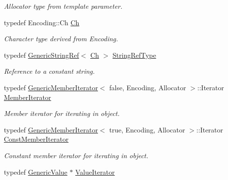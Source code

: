 \begin{DoxyCompactItemize}
\begin{DoxyCompactList}\small\item\em Allocator type from template parameter. \end{DoxyCompactList}\item 
typedef Encoding\+::\+Ch \hyperlink{class_generic_value_ade0e0ce64ccd5d852da57a35e720bafb}{Ch}\hypertarget{class_generic_value_ade0e0ce64ccd5d852da57a35e720bafb}{}\label{class_generic_value_ade0e0ce64ccd5d852da57a35e720bafb}

\begin{DoxyCompactList}\small\item\em Character type derived from Encoding. \end{DoxyCompactList}\item 
typedef \hyperlink{struct_generic_string_ref}{Generic\+String\+Ref}$<$ \hyperlink{class_generic_value_ade0e0ce64ccd5d852da57a35e720bafb}{Ch} $>$ \hyperlink{class_generic_value_a32e0f30ee278072374c8168b14d3317f}{String\+Ref\+Type}\hypertarget{class_generic_value_a32e0f30ee278072374c8168b14d3317f}{}\label{class_generic_value_a32e0f30ee278072374c8168b14d3317f}

\begin{DoxyCompactList}\small\item\em Reference to a constant string. \end{DoxyCompactList}\item 
typedef \hyperlink{class_generic_member_iterator}{Generic\+Member\+Iterator}$<$ false, Encoding, Allocator $>$\+::Iterator \hyperlink{class_generic_value_a349b8faae61edc42b4289726820be439}{Member\+Iterator}\hypertarget{class_generic_value_a349b8faae61edc42b4289726820be439}{}\label{class_generic_value_a349b8faae61edc42b4289726820be439}

\begin{DoxyCompactList}\small\item\em Member iterator for iterating in object. \end{DoxyCompactList}\item 
typedef \hyperlink{class_generic_member_iterator}{Generic\+Member\+Iterator}$<$ true, Encoding, Allocator $>$\+::Iterator \hyperlink{class_generic_value_aac08c3e660a9036d3dcb8b10ff6c61f4}{Const\+Member\+Iterator}\hypertarget{class_generic_value_aac08c3e660a9036d3dcb8b10ff6c61f4}{}\label{class_generic_value_aac08c3e660a9036d3dcb8b10ff6c61f4}

\begin{DoxyCompactList}\small\item\em Constant member iterator for iterating in object. \end{DoxyCompactList}\item 
typedef \hyperlink{class_generic_value}{Generic\+Value} $\ast$ \hyperlink{class_generic_value_aee30721a49688ba0f865f5d581eb6be9}{Value\+Iterator}\hypertarget{class_generic_value_aee30721a49688ba0f865f5d581eb6be9}{}\label{class_generic_value_aee30721a49688ba0f865f5d581eb6be9}


\end{DoxyCompactItemize}
